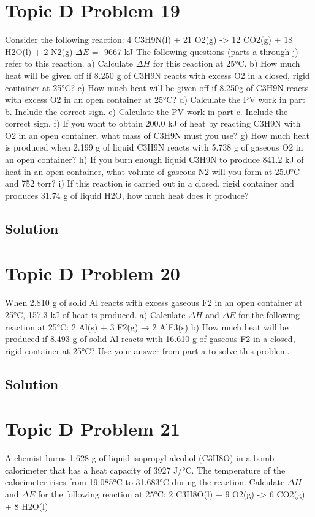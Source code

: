 \documentclass[10pt]{article}
\begin{document}
    \section{Topic D Problem 19}
        Consider the following reaction:
4 C3H9N(l) + 21 O2(g) -> 12 CO2(g) + 18 H2O(l) + 2 N2(g) $\Delta E$ = -9667 kJ
The following questions (parts a through j) refer to this reaction.
a) Calculate $\Delta H$ for this reaction at 25\unit{\celsius}.
b) How much heat will be given off if 8.250 g of C3H9N reacts with excess O2 in a closed,
rigid container at 25\unit{\celsius}?
c) How much heat will be given off if 8.250g of C3H9N reacts with excess O2 in an open
container at 25\unit{\celsius}?
d) Calculate the PV work in part b. Include the correct sign.
e) Calculate the PV work in part c. Include the correct sign.
f) If you want to obtain 200.0 kJ of heat by reacting C3H9N with O2 in an open container,
what mass of C3H9N must you use?
g) How much heat is produced when 2.199 g of liquid C3H9N reacts with 5.738 g of gaseous
O2 in an open container?
h) If you burn enough liquid C3H9N to produce 841.2 kJ of heat in an open container, what
volume of gaseous N2 will you form at 25.0\unit{\celsius} and 752 torr?
i) If this reaction is carried out in a closed, rigid container and produces 31.74 g of liquid
H2O, how much heat does it produce?
        
        \subsection{Solution}

    \pagebreak
    \section{Topic D Problem 20}
        When 2.810 g of solid Al reacts with excess gaseous F2 in an open container at 25\unit{\celsius}, 157.3
kJ of heat is produced.
a) Calculate $\Delta H$ and $\Delta E$ for the following reaction at 25\unit{\celsius}:
2 Al(s) + 3 F2(g) → 2 AlF3(s)
b) How much heat will be produced if 8.493 g of solid Al reacts with 16.610 g of gaseous F2
in a closed, rigid container at 25\unit{\celsius}? Use your answer from part a to solve this problem.
        
        \subsection{Solution}

    \pagebreak
    \section{Topic D Problem 21}
        A chemist burns 1.628 g of liquid isopropyl alcohol (C3H8O) in a bomb calorimeter that has a
heat capacity of 3927 J/\unit{\celsius}. The temperature of the calorimeter rises from 19.085\unit{\celsius} to
31.683\unit{\celsius} during the reaction. Calculate $\Delta H$ and $\Delta E$ for the following reaction at 25\unit{\celsius}:
2 C3H8O(l) + 9 O2(g) -> 6 CO2(g) + 8 H2O(l)
        
\end{document}
